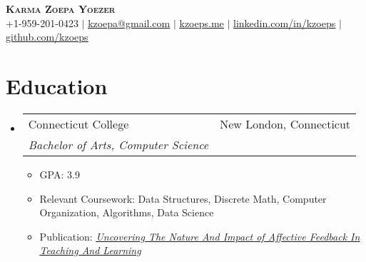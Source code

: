 \documentclass[letterpaper,11pt]{article}
\makeatletter
\newcommand{\resumeItem}[1]{
  \item\small{
    {#1 \vspace{-2pt}}
  }
}
\newcommand{\resumeSubheading}[4]{
  \vspace{-2pt}\item
    \begin{tabular*}{0.97\textwidth}[t]{l@{\extracolsep{\fill}}r}
      {#1} & #2 \\
      \textit{\small#3} & \textit{\small #4} \\
    \end{tabular*}\vspace{-7pt}
}
\newcommand{\resumeSubHeadingListStart}{\begin{itemize}[leftmargin=0.15in, label={}]}
\newcommand{\resumeSubHeadingListEnd}{\end{itemize}}
\newcommand{\resumeItemListStart}{\begin{itemize}}
\newcommand{\resumeItemListEnd}{\end{itemize}\vspace{-5pt}}
\makeatother
\begin{document}


\begin{center}
    \textbf{\Huge \scshape Karma Zoepa Yoezer} \\ \vspace{1pt}
    \small +1-959-201-0423 $|$ \href{mailto:kzoepa@gmailcom}{\underline{kzoepa@gmail.com}} $|$ \href{https://kzoeps.me}{\underline{kzoeps.me}} $|$ 
    \href{https://linkedin.com/in/kzoeps}{\underline{linkedin.com/in/kzoeps}} $|$
    \href{https://github.com/kzoeps}{\underline{github.com/kzoeps}}
\end{center}

%

\section{Education}
  \resumeSubHeadingListStart
    \resumeSubheading
      {Connecticut College}{New London, Connecticut}
      {Bachelor of Arts, Computer Science}{}
          \resumeItemListStart
            \resumeItem{GPA: 3.9}
            \resumeItem{Relevant Coursework: Data Structures, Discrete Math, Computer Organization, Algorithms, Data Science}
            \resumeItem{Publication: \href{https://library.iated.org/view/TARIMO2020UNC}{   \emph{
                \underline{Uncovering The Nature And Impact of Affective Feedback In  Teaching And Learning}
                }
            }
        }
            
        \resumeItemListEnd

  \resumeSubHeadingListEnd

\end{document}
